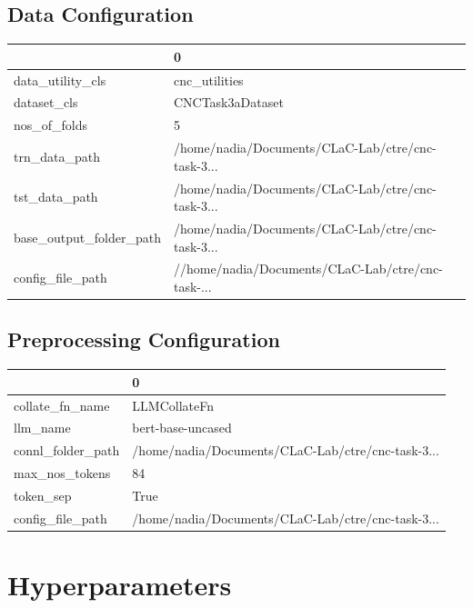 \documentclass{article}
\begin{document}
\subsection{Data Configuration}
\begin{tabular}{ll}
\toprule
{} &                                                  0 \\
\midrule
data\_utility\_cls        &                                      cnc\_utilities \\
dataset\_cls             &                                   CNCTask3aDataset \\
nos\_of\_folds            &                                                  5 \\
trn\_data\_path           &  /home/nadia/Documents/CLaC-Lab/ctre/cnc-task-3... \\
tst\_data\_path           &  /home/nadia/Documents/CLaC-Lab/ctre/cnc-task-3... \\
base\_output\_folder\_path &  /home/nadia/Documents/CLaC-Lab/ctre/cnc-task-3... \\
config\_file\_path        &  //home/nadia/Documents/CLaC-Lab/ctre/cnc-task-... \\
\bottomrule
\end{tabular}

\subsection{Preprocessing Configuration}
\begin{tabular}{ll}
\toprule
{} &                                                  0 \\
\midrule
collate\_fn\_name   &                                       LLMCollateFn \\
llm\_name          &                                  bert-base-uncased \\
connl\_folder\_path &  /home/nadia/Documents/CLaC-Lab/ctre/cnc-task-3... \\
max\_nos\_tokens    &                                                 84 \\
token\_sep         &                                               True \\
config\_file\_path  &  /home/nadia/Documents/CLaC-Lab/ctre/cnc-task-3... \\
\bottomrule
\end{tabular}

\section{Hyperparameters}
\end{document}
